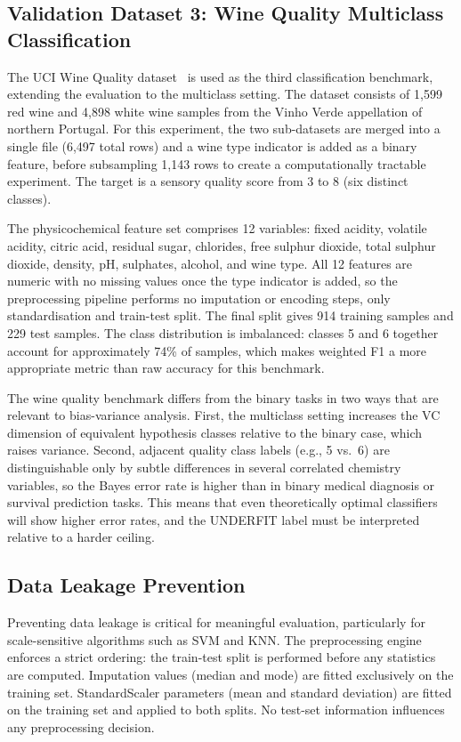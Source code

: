 \documentclass[conference]{IEEEtran}
\begin{document}
\subsection{Validation Dataset 3: Wine Quality Multiclass Classification}

The UCI Wine Quality dataset~\cite{b37} is used as the third classification benchmark, extending the evaluation to the multiclass setting. The dataset consists of 1,599 red wine and 4,898 white wine samples from the Vinho Verde appellation of northern Portugal. For this experiment, the two sub-datasets are merged into a single file (6,497 total rows) and a wine type indicator is added as a binary feature, before subsampling 1,143 rows to create a computationally tractable experiment. The target is a sensory quality score from 3 to 8 (six distinct classes).

The physicochemical feature set comprises 12 variables: fixed acidity, volatile acidity, citric acid, residual sugar, chlorides, free sulphur dioxide, total sulphur dioxide, density, pH, sulphates, alcohol, and wine type. All 12 features are numeric with no missing values once the type indicator is added, so the preprocessing pipeline performs no imputation or encoding steps, only standardisation and train-test split. The final split gives 914 training samples and 229 test samples. The class distribution is imbalanced: classes 5 and 6 together account for approximately 74\% of samples, which makes weighted F1 a more appropriate metric than raw accuracy for this benchmark.

The wine quality benchmark differs from the binary tasks in two ways that are relevant to bias-variance analysis. First, the multiclass setting increases the VC dimension of equivalent hypothesis classes relative to the binary case, which raises variance. Second, adjacent quality class labels (e.g., 5 vs.\ 6) are distinguishable only by subtle differences in several correlated chemistry variables, so the Bayes error rate is higher than in binary medical diagnosis or survival prediction tasks. This means that even theoretically optimal classifiers will show higher error rates, and the UNDERFIT label must be interpreted relative to a harder ceiling.

\subsection{Data Leakage Prevention}

Preventing data leakage is critical for meaningful evaluation, particularly for scale-sensitive algorithms such as SVM and KNN. The preprocessing engine enforces a strict ordering: the train-test split is performed before any statistics are computed. Imputation values (median and mode) are fitted exclusively on the training set. StandardScaler parameters (mean and standard deviation) are fitted on the training set and applied to both splits. No test-set information influences any preprocessing decision.
\end{document}
